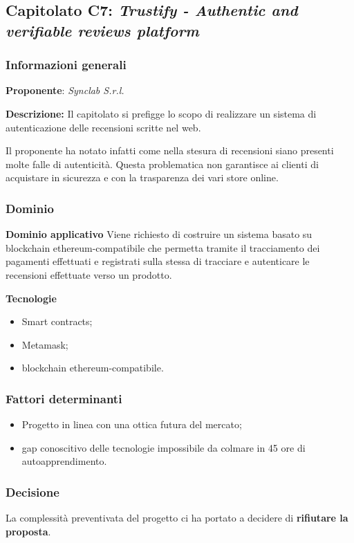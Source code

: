 \subsection{Capitolato C7: \textit{Trustify - Authentic and verifiable reviews platform }}
\subsubsection{Informazioni generali}

\textbf{Proponente}: \textit{Synclab S.r.l.} 

\textbf{Descrizione:}
Il capitolato si prefigge lo scopo di realizzare un sistema di autenticazione delle recensioni scritte nel web.

Il proponente ha notato infatti come nella stesura di recensioni siano presenti molte falle di autenticità. Questa problematica non garantisce ai clienti di acquistare in sicurezza e con la trasparenza dei vari store online.

\subsubsection{Dominio}

\textbf{Dominio applicativo}
Viene richiesto di costruire un sistema basato su blockchain ethereum-compatibile che permetta tramite il tracciamento dei pagamenti effettuati e registrati sulla stessa di tracciare e autenticare le recensioni effettuate verso un prodotto.

\textbf{Tecnologie}

\begin{itemize}
    \item Smart contracts;
    \item Metamask;
    \item blockchain ethereum-compatibile. 
\end{itemize}

\subsubsection{Fattori determinanti}
\begin{itemize}
    \item Progetto in linea con una ottica futura del mercato;
    \item gap conoscitivo delle tecnologie impossibile da colmare in 45 ore di autoapprendimento.
\end{itemize}
\subsubsection{Decisione}

La complessità preventivata del progetto ci ha portato a decidere di \textbf{rifiutare la proposta}.
